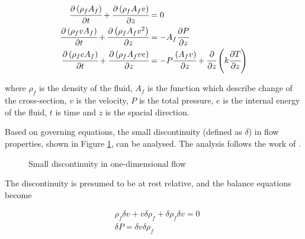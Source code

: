 \documentclass[a4paper,fleqn]{cas-dc}
\begin{document}
{\footnotesize
	\begin{align}
		\label{EQ: CompressibleEuler_1}
		\cfrac{\partial \left( \rho_f A_f \right) }{\partial t} + \cfrac{\partial \left( \rho_f A_f v \right)}{\partial z} &= 0 \\
		\cfrac{\partial \left( \rho_f v A_f \right) }{\partial t} + \cfrac{\partial \left( \rho_f A_f v^2 \right)}{\partial z} &= -A_f \cfrac{\partial P}{\partial z} \label{EQ: CompressibleEuler_2} \\
		\cfrac{\partial \left( \rho_f e A_f \right) }{\partial t} + \cfrac{\partial \left( \rho_f A_f v e\right)}{\partial z} &= -P\cfrac{\left( A_f v \right)}{\partial z} + \cfrac{\partial}{\partial z} \left( k \cfrac{\partial T}{\partial z} \right)   
		\label{EQ: CompressibleEuler_3}
	\end{align}  
}

where $\rho_f$ is the density of the fluid, $A_f$ is the function which describe change of the cross-section, $v$ is the velocity, $P$ is the total pressure, $e$ is the internal energy of the fluid, $t$ is time and $z$ is the spacial direction.

Based on governing equations, the small discontinuity (defined as $\delta$) in flow properties, shown in Figure \ref{fig: Discontinuity_slow_flow}, can be analysed. The analysis follows the work of \citet{Schreier1982}.

\begin{figure}[!h]
	\centering
	\caption{Small discontinuity in one-dimensional flow}
	\label{fig: Discontinuity_slow_flow}
\end{figure} 

The discontinuity is presumed to be at rest relative, and the balance equations become		

{\footnotesize
	\begin{align*}
		&\rho_f \delta v + v \delta \rho_f + \delta \rho_f \delta v = 0 \\
		&\delta P = \delta v \delta \rho_f
	\end{align*}
}
\end{document}
